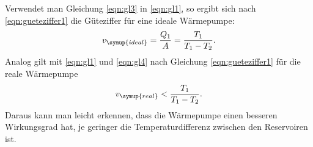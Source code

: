   Verwendet man Gleichung \eqref{eqn:gl3} in \eqref{eqn:gl1}, so ergibt sich nach
  \eqref{eqn:gueteziffer1} die Güteziffer für eine ideale Wärmepumpe:
  \begin{equation}
    v_\symup{ideal} = \frac {Q_1}{A} = \frac{T_1}{T_1 - T_2}.
    \label{eqn:gueteziffer_ideal}
  \end{equation}
  Analog gilt mit \eqref{eqn:gl1} und \eqref{eqn:gl4} nach Gleichung \eqref{eqn:gueteziffer1}
  für die reale Wärmepumpe
  \begin{equation}
    v_\symup{real} < \frac{T_1}{T_1 - T_2}.
    \label{eqn:gueteziffer_real}
  \end{equation}
  Daraus kann man leicht erkennen, dass die Wärmepumpe einen besseren Wirkungsgrad
  hat, je geringer die Temperaturdifferenz zwischen den Reservoiren ist.



